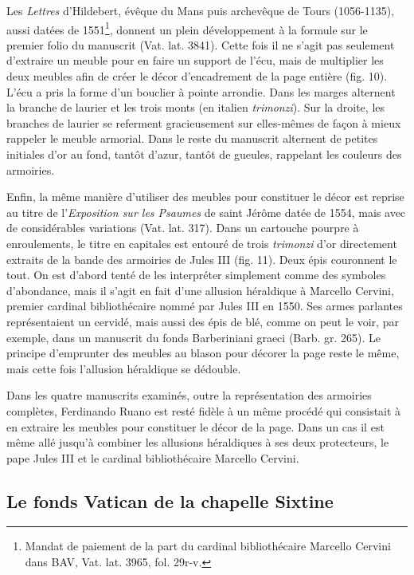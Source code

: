 \documentclass[12pt,twoside,openany]{book}
\begin{document}
Les \textit{Lettres} d’Hildebert, évêque du Mans puis archevêque de Tours (1056-1135), aussi datées de 1551\footnote{Mandat de paiement de la part du cardinal bibliothécaire Marcello Cervini dans BAV, Vat. lat. 3965, fol. 29r-v.}, donnent un plein développement à la formule sur le premier folio du manuscrit (Vat. lat. 3841). Cette fois il ne s’agit pas seulement d’extraire un meuble pour en faire un support de l’écu, mais de multiplier les deux meubles afin de créer le décor d’encadrement de la page entière (fig. 10). L’écu a pris la forme d’un bouclier à pointe arrondie. Dans les marges alternent la branche de laurier et les trois monts (en italien \textit{trimonzi}). Sur la droite, les branches de laurier se referment gracieusement sur elles-mêmes de façon à mieux rappeler le meuble armorial. Dans le reste du manuscrit alternent de petites initiales d’or au fond, tantôt d’azur, tantôt de gueules, rappelant les couleurs des armoiries.

Enfin, la même manière d’utiliser des meubles pour constituer le décor est reprise au titre de l’\textit{Exposition sur les Psaumes} de saint Jérôme datée de 1554, mais avec de considérables variations (Vat. lat. 317). Dans un cartouche pourpre à enroulements, le titre en capitales est entouré de trois \textit{trimonzi} d’or directement extraits de la bande des armoiries de Jules III (fig. 11). Deux épis couronnent le tout. On est d’abord tenté de les interpréter simplement comme des symboles d’abondance, mais il s’agit en fait d’une allusion héraldique à Marcello Cervini, premier cardinal bibliothécaire nommé par Jules III en 1550. Ses armes parlantes représentaient un cervidé, mais aussi des épis de blé, comme on peut le voir, par exemple, dans un manuscrit du fonds Barberiniani graeci (Barb. gr. 265). Le principe d’emprunter des meubles au blason pour décorer la page reste le même, mais cette fois l’allusion héraldique se dédouble.

Dans les quatre manuscrits examinés, outre la représentation des armoiries complètes, Ferdinando Ruano est resté fidèle à un même procédé qui consistait à en extraire les meubles pour constituer le décor de la page. Dans un cas il est même allé jusqu’à combiner les allusions héraldiques à ses deux protecteurs, le pape Jules III et le cardinal bibliothécaire Marcello Cervini.

\subsection{Le fonds Vatican de la chapelle Sixtine}
\end{document}
